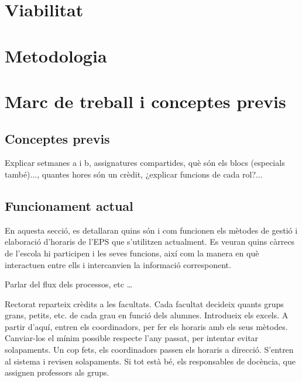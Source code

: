 \documentclass[a4paper,12pt]{ThesisStyle}
\begin{document}


\chapter{Viabilitat}
\label{cap:viabilitat}



\chapter{Metodologia}
\label{cap:metodologia}



\chapter{Marc de treball i conceptes previs}  %
\label{cap:marcdetreball}

\section{Conceptes previs}
\label{sec:conceptes_previs}
Explicar setmanes a i b, assignatures compartides, què són els blocs (especials també)..., quantes hores
són un crèdit, ¿explicar funcions de cada rol?... 

\section{Funcionament actual}
\label{sec:funcionament_actual}

En aquesta secció, es detallaran quins són i com funcionen els mètodes de gestió i elaboració d'horaris de l'EPS que s'utilitzen actualment. Es veuran quins càrrecs de l'escola hi participen i les seves funcions, així com la manera en què interactuen entre ells i intercanvien la informació corresponent.

Parlar del flux dels processos, etc \ldots

Rectorat reparteix crèdits a les facultats. Cada facultat decideix quants grups grans, petits, etc. de cada grau en funció dels alumnes. Introdueix els excels.
A partir d'aquí, entren els coordinadors, per fer els horaris amb els seus mètodes. Canviar-los el mínim possible respecte l'any passat, per intentar evitar
solapaments. Un cop fets, els coordinadors passen els horaris a direcció. S'entren al sistema i revisen solapaments. Si tot està bé, els responsables de docència,
que assignen professors als grups. 
\end{document}
